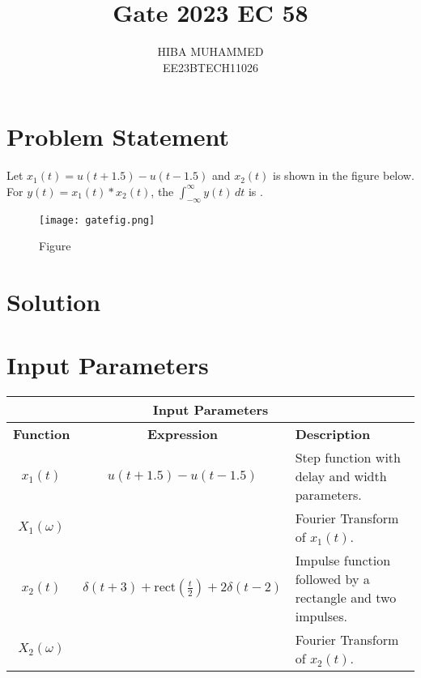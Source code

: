 \documentclass[journal,12pt,onecolumn]{IEEEtran}
\theoremstyle{remark}
\begin{document}
\let\vec\mathbf



\title{Gate 2023 EC 58}
\author{HIBA MUHAMMED\\
        EE23BTECH11026}
\maketitle

\section*{Problem Statement}
Let $x_1(t) = u(t + 1.5) - u(t - 1.5)$ and $x_2(t)$ is shown in the figure below. For $y(t) = x_1(t) * x_2(t)$, the $\int_{-\infty}^{\infty} y(t) \, dt$ is \underline{\hspace{2cm}}.

\begin{figure}[htbp]
    \centering
    \texttt{[image: gatefig.png]}
    \caption{Figure}
    \label{fig:graph}
\end{figure}

\section*{Solution}
\section*{Input Parameters}
\begin{table}[htbp]
    \centering
    \begin{tabular}{|c|c|p{6cm}|}
        \hline
        \multicolumn{3}{|c|}{\textbf{Input Parameters}} \\
        \hline
        \textbf{Function} & \textbf{Expression} & \textbf{Description} \\
        \hline
        $x_1(t)$ & $u(t + 1.5) - u(t - 1.5)$ & Step function with delay and width parameters. \\
        \hline
        $X_1(\omega)$ &  & Fourier Transform of $x_1(t)$. \\
        \hline
        $x_2(t)$ & $\delta(t + 3) + \text{rect}\left(\frac{t}{2}\right) + 2\delta(t - 2)$ & Impulse function followed by a rectangle and two impulses. \\
        \hline
        $X_2(\omega)$ &  & Fourier Transform of $x_2(t)$. \\
        \hline
    \end{tabular}
\end{table}
\end{document}
